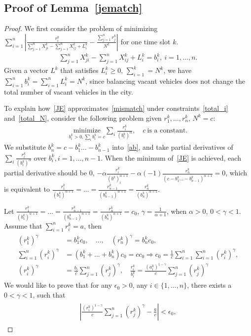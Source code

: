 \documentclass[10pt,twocolumn,twoside,english]{IEEEtran}
\begin{document}
\subsection{Proof of Lemma~\ref{jematch}}
\label{appendix_probform}
\begin{proof}
We first consider the problem of minimizing $\sum_{i=1}^{n}\left|\frac{r^k_i}{\sum\limits_{j=1}^{n} X^k_{ji}-\sum\limits_{j=1}^{n} X^k_{ij} + L^k_i}-\frac{\sum\limits_{j=1}^n r_j^k}{N^k}\right|$ for one time slot $k$. \begin{align}
\sum\limits_{j=1}^{n} X^k_{ji}-\sum\limits_{j=1}^{n} X^k_{ij} + L^k_i =b^k_i, \ i=1,\dots, n.
\label{bi}
\end{align}
Given a vector $L^k$ that satisfies $L^k_i \geqslant 0$, $\sum\limits_{i=1}^k=N^k$, we have $\sum\limits_{i=1}^n b^k_i=\sum\limits_{i=1}^n L^k_i = N^k$, since balancing vacant vehicles does not change the total number of vacant vehicles in the city. 
 
To explain how~\eqref{JE} approximates~\eqref{mismatch} under constraints~\eqref{total_i} and~\eqref{total_N}, consider the following problem given $r^k_1, \dots, r^k_n$, $N^k=c$:
\begin{align}
	\underset{b^k_i>0, \sum_i b^k_i = c}{\text{minimize}}\sum_i \frac{r^k_i}{(b^k_i)^\alpha},\quad c\ \text{is a constant}.
	\label{ab}
\end{align}
We substitute $b^k_n=c-b^k_1\dots-b^k_{n-1}$ into~\eqref{ab}, and take partial derivatives of $\sum_i \frac{r^k_i}{(b^k_i)^\alpha}$ over $b^k_i, i=1,\dots, n-1$. When the minimum of~\eqref{JE} is achieved, each partial derivative should be $0$, $-\alpha \frac{r^k_i}{(b^k)_i^{\alpha+1}}-\alpha (-1)\frac{r^k_n}{(c-b^k_1\dots-b^k_{n-1})^{\alpha+1}}=0$, which is equivalent to $\frac{r^k_1}{(b^k_1)^{\alpha+1}}=\dots=\frac{r^k_{n-1}}{(b^k_{n-1})^{\alpha+1}}=\frac{r^k_n}{(b^k_n)^{\alpha+1}}.$


Let $\frac{r^k_1}{(b^k_1)^{\alpha+1}}=\dots=\frac{r^k_{n-1}}{(b^k_{n-1})^{\alpha+1}}=\frac{r^k_n}{(b^k_n)^{\alpha+1}}=c_0$, $\gamma=\frac{1}{\alpha+1}$, when $\alpha>0$, $0<\gamma<1$. Assume that $\sum\limits_{i=1}^{n}r^k_i = a$, then
\begin{align*}
\begin{split}
(r^k_1)^{\gamma}&=b^k_1 c_0,\quad \dots,\quad(r^k_n)^{\gamma}=b^k_n c_0, \\
\sum\limits_{i=1}^{n}(r^k_i)^{\gamma}&=(b^k_1+\dots+b^k_n)c_0=c c_0 \Rightarrow c_0= \frac{1}{c} \sum\limits_{i=1}^{n}\sum\limits_{i=1}^{n}(r^k_i)^{\gamma},\\
(r^k_i)^{\gamma}&=\frac{b_i}{c} \sum\limits_{j=1}^{n}(r^k_j)^{\gamma},\quad \frac{r^k_i}{b^k_i}=\frac{(a^k_i)^{1-\gamma}}{c} \sum\limits_{j=1}^{n}(r^k_j)^{\gamma}
\end{split}
\end{align*}
We would like to prove that for any $\epsilon_0 >0$,  any $i\in\{1, \dots, n\}$, there exists a $0 < \gamma <1$, such that
\begin{align}
\begin{split}
 \left|\frac{(r^k_i)^{1-\gamma}}{c} \sum\limits_{j=1}^{n}(r^k_j)^{\gamma}-\frac{a}{c} \right| < \epsilon_0,
\end{split}
\label{epsilon0}
\end{align}


\end{proof}
\end{document}
